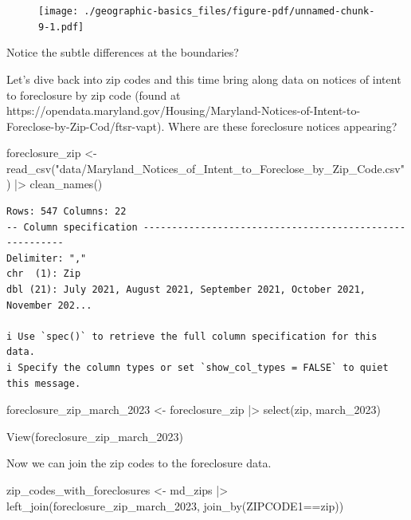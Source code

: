 \documentclass[
  letterpaper,
  DIV=11,
  numbers=noendperiod]{scrreprt}
\newenvironment{Shaded}{\begin{snugshade}}{\end{snugshade}}
\newcommand{\FunctionTok}[1]{\textcolor[rgb]{0.28,0.35,0.67}{#1}}
\newcommand{\NormalTok}[1]{\textcolor[rgb]{0.00,0.23,0.31}{#1}}
\newcommand{\OtherTok}[1]{\textcolor[rgb]{0.00,0.23,0.31}{#1}}
\newcommand{\SpecialCharTok}[1]{\textcolor[rgb]{0.37,0.37,0.37}{#1}}
\newcommand{\StringTok}[1]{\textcolor[rgb]{0.13,0.47,0.30}{#1}}
\begin{document}
\begin{figure}[H]

{\centering \texttt{[image: ./geographic-basics\_files/figure-pdf/unnamed-chunk-9-1.pdf]}

}

\end{figure}

Notice the subtle differences at the boundaries?

Let's dive back into zip codes and this time bring along data on notices
of intent to foreclosure by zip code (found at
https://opendata.maryland.gov/Housing/Maryland-Notices-of-Intent-to-Foreclose-by-Zip-Cod/ftsr-vapt).
Where are these foreclosure notices appearing?

\begin{Shaded}
\begin{Highlighting}[]
\NormalTok{foreclosure\_zip }\OtherTok{\textless{}{-}} \FunctionTok{read\_csv}\NormalTok{(}\StringTok{"data/Maryland\_Notices\_of\_Intent\_to\_Foreclose\_by\_Zip\_Code.csv"}\NormalTok{) }\SpecialCharTok{|\textgreater{}} \FunctionTok{clean\_names}\NormalTok{()}
\end{Highlighting}
\end{Shaded}

\begin{verbatim}
Rows: 547 Columns: 22
-- Column specification --------------------------------------------------------
Delimiter: ","
chr  (1): Zip
dbl (21): July 2021, August 2021, September 2021, October 2021, November 202...

i Use `spec()` to retrieve the full column specification for this data.
i Specify the column types or set `show_col_types = FALSE` to quiet this message.
\end{verbatim}

\begin{Shaded}
\begin{Highlighting}[]
\NormalTok{foreclosure\_zip\_march\_2023 }\OtherTok{\textless{}{-}}\NormalTok{ foreclosure\_zip }\SpecialCharTok{|\textgreater{}} 
  \FunctionTok{select}\NormalTok{(zip, march\_2023)}

\FunctionTok{View}\NormalTok{(foreclosure\_zip\_march\_2023)}
\end{Highlighting}
\end{Shaded}

Now we can join the zip codes to the foreclosure data.

\begin{Shaded}
\begin{Highlighting}[]
\NormalTok{zip\_codes\_with\_foreclosures }\OtherTok{\textless{}{-}}\NormalTok{ md\_zips }\SpecialCharTok{|\textgreater{}} \FunctionTok{left\_join}\NormalTok{(foreclosure\_zip\_march\_2023, }\FunctionTok{join\_by}\NormalTok{(ZIPCODE1}\SpecialCharTok{==}\NormalTok{zip))}
\end{Highlighting}
\end{Shaded}
\end{document}
